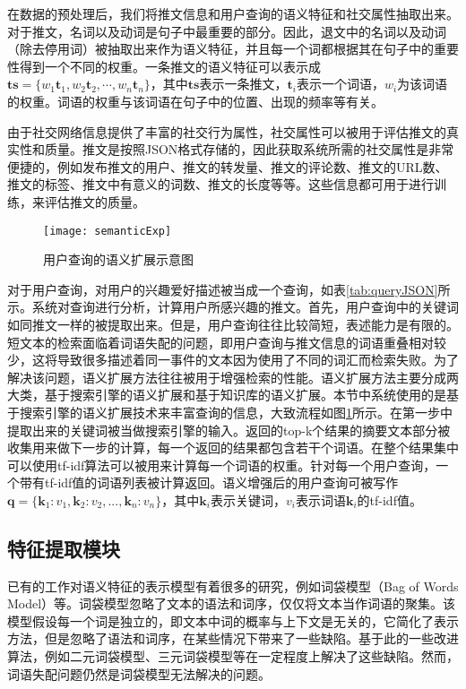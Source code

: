 在数据的预处理后，我们将推文信息和用户查询的语义特征和社交属性抽取出来。对于推文，名词以及动词是句子中最重要的部分。因此，退文中的名词以及动词（除去停用词）被抽取出来作为语义特征，并且每一个词都根据其在句子中的重要性得到一个不同的权重。一条推文的语义特征可以表示成$\mathbf{ts} = \{ {w_1}{\mathbf{t}_1},{w_2}{\mathbf{t}_2},\cdots,{w_n}{\mathbf{t}_n}\}$，其中$\mathbf{ts}$表示一条推文，$\mathbf{t}_i$表示一个词语，$w_i$为该词语的权重。词语的权重与该词语在句子中的位置、出现的频率等有关。

由于社交网络信息提供了丰富的社交行为属性，社交属性可以被用于评估推文的真实性和质量。推文是按照JSON格式存储的，因此获取系统所需的社交属性是非常便捷的，例如发布推文的用户、推文的转发量、推文的评论数、推文的URL数、推文的标签、推文中有意义的词数、推文的长度等等。这些信息都可用于进行训练，来评估推文的质量。

\begin{figure}[!htbp] %
  \centering
  \texttt{[image: semanticExp]}
  \caption{用户查询的语义扩展示意图}
  \label{fig:semanticExp}
\end{figure}

对于用户查询，对用户的兴趣爱好描述被当成一个查询，如表\ref{tab:queryJSON}所示。系统对查询进行分析，计算用户所感兴趣的推文。首先，用户查询中的关键词如同推文一样的被提取出来。但是，用户查询往往比较简短，表述能力是有限的。短文本的检索面临着词语失配的问题，即用户查询与推文信息的词语重叠相对较少，这将导致很多描述着同一事件的文本因为使用了不同的词汇而检索失败。为了解决该问题，语义扩展方法往往被用于增强检索的性能。语义扩展方法主要分成两大类，基于搜索引擎的语义扩展和基于知识库的语义扩展。本节中系统使用的是基于搜索引擎的语义扩展技术来丰富查询的信息，大致流程如图\ref{fig:semanticExp}所示。在第一步中提取出来的关键词被当做搜索引擎的输入。返回的top-k个结果的摘要文本部分被收集用来做下一步的计算，每一个返回的结果都包含若干个词语。在整个结果集中可以使用tf-idf算法可以被用来计算每一个词语的权重。针对每一个用户查询，一个带有tf-idf值的词语列表被计算返回。语义增强后的用户查询可被写作$\mathbf{q} = \{ {\mathbf{k}_1}:{v_1},{\mathbf{k}_2}:{v_2},...,{\mathbf{k}_n}:{v_n}\}$，其中$\mathbf{k}_i$表示关键词，$v_i$表示词语$\mathbf{k}_i$的tf-idf值。

\subsection{特征提取模块}
\label{subsec2:featureRep}
已有的工作对语义特征的表示模型有着很多的研究，例如词袋模型（Bag of Words Model）等。词袋模型忽略了文本的语法和词序，仅仅将文本当作词语的聚集。该模型假设每一个词是独立的，即文本中词的概率与上下文是无关的，它简化了表示方法，但是忽略了语法和词序，在某些情况下带来了一些缺陷。基于此的一些改进算法，例如二元词袋模型、三元词袋模型等在一定程度上解决了这些缺陷。然而，词语失配问题仍然是词袋模型无法解决的问题。

